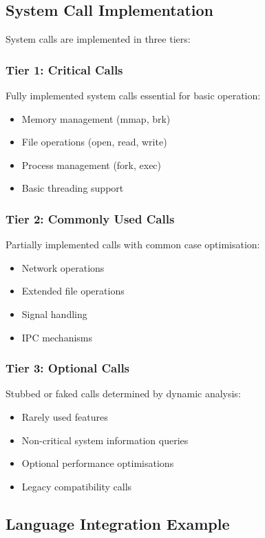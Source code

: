 \documentclass[conference]{IEEEtran}
\begin{document}
\subsection{System Call Implementation}
System calls are implemented in three tiers:

\subsubsection{Tier 1: Critical Calls}
Fully implemented system calls essential for basic operation:
\begin{itemize}
	\item Memory management (mmap, brk)
	\item File operations (open, read, write)
	\item Process management (fork, exec)
	\item Basic threading support
\end{itemize}

\subsubsection{Tier 2: Commonly Used Calls}
Partially implemented calls with common case optimisation:
\begin{itemize}
	\item Network operations
	\item Extended file operations
	\item Signal handling
	\item IPC mechanisms
\end{itemize}

\subsubsection{Tier 3: Optional Calls}
Stubbed or faked calls determined by dynamic analysis:
\begin{itemize}
	\item Rarely used features
	\item Non-critical system information queries
	\item Optional performance optimisations
	\item Legacy compatibility calls
\end{itemize}


\subsection{Language Integration Example}
\end{document}
